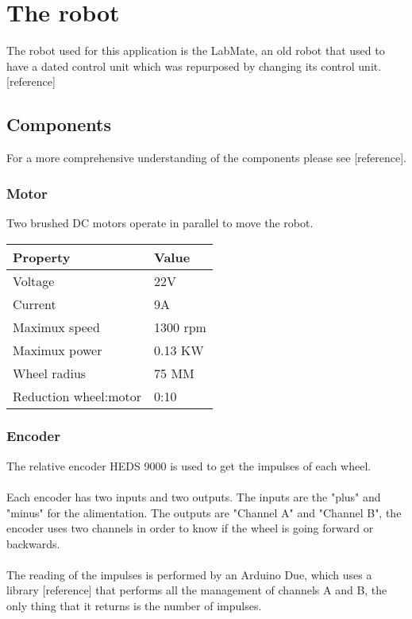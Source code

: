 \chapter{The robot}
The robot used for this application is the LabMate, an old robot that used to have a dated control unit which was repurposed by changing its 
control unit. [reference]

\section{Components}
For a more comprehensive understanding of the components please see [reference].

\subsection{Motor}
Two brushed DC motors operate in parallel to move the robot.

\begin{center}
    \begin{table}[h]
        \begin{tabular} {| m{20em} | m{20em} |}
            \hline
            \textbf{Property} &  \textbf{Value} \\
            \hline
            Voltage & 22V \\
            \hline
            Current & 9A \\
            \hline
            Maximux speed & 1300 rpm \\
            \hline
            Maximux power & 0.13 KW \\
            \hline
            Wheel radius & 75 MM \\
            \hline
            Reduction wheel:motor & 0:10 \\
            \hline
        \end{tabular}
    \end{table}
\end{center}

\subsection{Encoder}
The relative encoder HEDS 9000 is used to get the impulses of each wheel. 
\\ \\
Each encoder has two inputs and two outputs. The inputs are the "plus" and "minus" for the alimentation. The outputs are "Channel A" and "Channel B", the encoder 
uses two channels in order to know if the wheel is going forward or backwards.
\\ \\
The reading of the impulses is performed by an Arduino Due, which uses a library [reference] that performs all the management of channels A and B, the only thing that it returns is the number of impulses.

